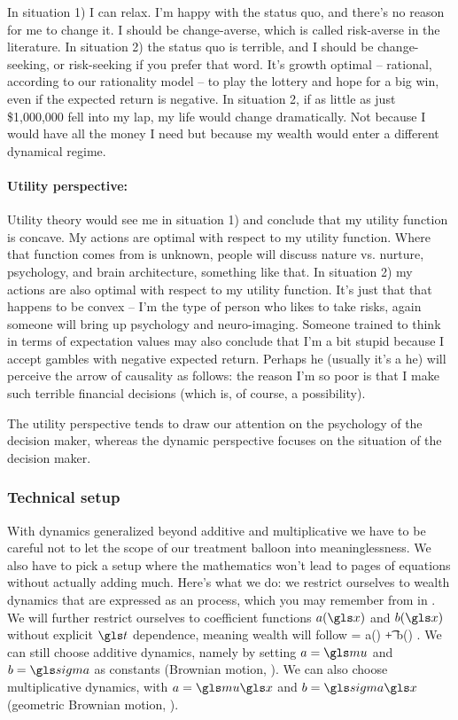 In situation 1) I can relax. I'm happy with the status quo, and there's no reason for me to change it. 
I should be change-averse, which is called risk-averse in the literature. In situation 2) the 
status quo is terrible, and I should be change-seeking, or risk-seeking if you prefer that word.
It's growth optimal -- rational, according to our rationality model -- to play the lottery and hope for a big win, even if the expected return is negative. In situation 2, if as 
little as just \$1,000,000 fell into my lap, my life would change dramatically. Not because I would 
have all the money I need but because my wealth would enter a different dynamical regime. 

\paragraph{\bf Utility perspective:}
Utility theory would see me in situation 1) and conclude that my utility function 
is concave. My actions are optimal with respect to my utility function. Where that function 
comes from is unknown, people will discuss nature vs. nurture, psychology, and brain architecture, 
something like that. In situation 2) my actions are also optimal 
with respect to my utility function. It's just that that happens to be convex -- I'm the type of person 
who likes to take risks, again someone will bring up psychology and neuro-imaging. Someone 
trained to think in terms of expectation values may also conclude that I'm a bit stupid because I 
accept gambles with negative expected return. Perhaps he (usually it's a he) will perceive the 
arrow of causality as follows: the reason I'm so poor is that I make such terrible 
financial decisions (which is, of course, a possibility).

The utility perspective tends to draw our attention on the psychology of the decision maker, 
whereas the dynamic perspective focuses on the situation of the decision maker. 

\subsubsection{Technical setup}

With dynamics generalized beyond additive and multiplicative we have to be careful not to 
let the scope of our treatment balloon into meaninglessness. We also have to pick a setup 
where the mathematics won't lead to pages of equations without actually adding much.
Here's what we do: we restrict ourselves to 
wealth dynamics that are expressed as an \Ito process, which you may remember from 
 in . We will further restrict ourselves to coefficient functions  
$a(\x)$ and $b(\x)$ without explicit $\t$ dependence, meaning wealth will follow 
\be
\gd\x = a(\x) \gd\t + b(\x) \gd\gW.
\ee
We can still choose additive dynamics, namely by setting $a=\gmu$ and $b=\gsigma$ as constants 
(Brownian motion, ). We can also choose multiplicative dynamics, with $a=\gmu\x$ and $b=\gsigma\x$ 
(geometric Brownian motion, ).


